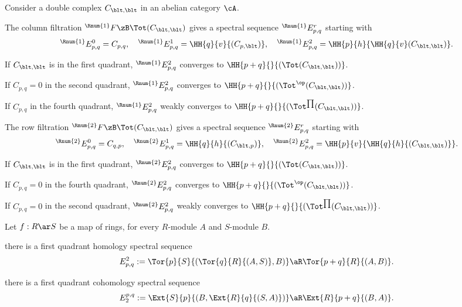 \documentclass[article, a4paper, twoside]{universal}
\begin{document}
\begin{thm}[5.6.1, 5.6.2]
    Consider a double complex $C_{\blt,\blt}$ in an abelian category $\cA$.

    The column filtration ${}^{\Rnum{1}}F\zB\Tot(C_{\blt,\blt})$ gives a spectral sequence ${}^{\Rnum{1}}E_{p,q}^{r}$ starting with
    \[
        {}^{\Rnum{1}}E_{p,q}^{0}=C_{p,q},\quad {}^{\Rnum{1}}E_{p,q}^{1}=\HH{q}{v}{(C_{p,\blt})},\quad {}^{\Rnum{1}}E_{p,q}^{2}=\HH{p}{h}{\HH{q}{v}(C_{\blt,\blt})}.
    \]

    \begin{itm}
        \item If $C_{\blt,\blt}$ is in the first quadrant, ${}^{\Rnum{1}}E_{p,q}^{2}$ converges to $\HH{p+q}{}{(\Tot(C_{\blt,\blt}))}$.
        \item If $C_{p,q}=0$ in the second quadrant, ${}^{\Rnum{1}}E_{p,q}^{2}$ converges to $\HH{p+q}{}{(\Tot^{\op}(C_{\blt,\blt}))}$.
        \item If $C_{p,q}$ in the fourth quadrant, ${}^{\Rnum{1}}E_{p,q}^{2}$ weakly converges to $\HH{p+q}{}{(\Tot^{\prod}(C_{\blt,\blt}))}$.
    \end{itm}

    The row filtration ${}^{\Rnum{2}}F\zB\Tot(C_{\blt,\blt})$ gives a spectral sequence ${}^{\Rnum{2}}E_{p,q}^{r}$ starting with
    \[
        {}^{\Rnum{2}}E_{p,q}^{0}=C_{q,p},\quad {}^{\Rnum{2}}E_{p,q}^{1}=\HH{q}{h}{(C_{\blt,p})},\quad {}^{\Rnum{2}}E_{p,q}^{2}=\HH{p}{v}{\HH{q}{h}{(C_{\blt,\blt})}}.
    \]

    \begin{itm}
        \item If $C_{\blt,\blt}$ is in the first quadrant, ${}^{\Rnum{2}}E_{p,q}^{2}$ converges to $\HH{p+q}{}{(\Tot(C_{\blt,\blt}))}$.
        \item If $C_{p,q}=0$ in the fourth quadrant, ${}^{\Rnum{2}}E_{p,q}^{2}$ converges to $\HH{p+q}{}{(\Tot^{\op}(C_{\blt,\blt}))}$.
        \item If $C_{p,q}=0$ in the second quadrant, ${}^{\Rnum{2}}E_{p,q}^{2}$ weakly converges to $\HH{p+q}{}{(\Tot^{\prod}(C_{\blt,\blt}))}$.
    \end{itm}
\end{thm}

\begin{thm}[5.6.6, 5.6.3]
    Let $f:R\ar S$ be a map of rings, for every $R$-module $A$ and $S$-module $B$.
    \begin{itm}
        \item there is a first quadrant homology spectral sequence
        \[
            E_{p,q}^{2}:=\Tor{p}{S}{(\Tor{q}{R}{(A,S)},B)}\aR\Tor{p+q}{R}{(A,B)}.
        \]
        \item there is a first quadrant cohomology spectral sequence
        \[
            E_{2}^{p,q}:=\Ext{S}{p}{(B,\Ext{R}{q}{(S,A)})}\aR\Ext{R}{p+q}{(B,A)}.
        \]
    \end{itm}
\end{thm}
\end{document}
